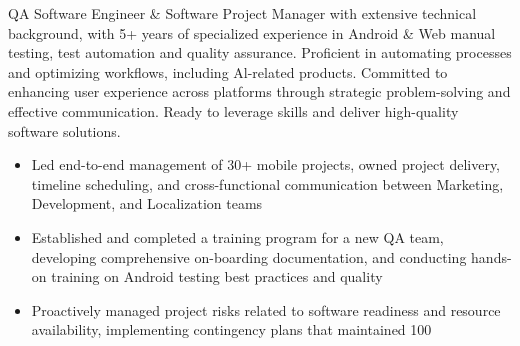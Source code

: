 \documentclass[10pt,a4paper,ragged2e]{altacv}
\begin{document}

\begin{fullwidth}
\makecvheader
\end{fullwidth}


QA Software Engineer \& Software Project Manager with extensive technical background, with 5+ years of specialized experience in Android \& Web manual testing, test automation and quality assurance. Proficient in automating processes and optimizing workflows, including Al-related products. Committed to enhancing user experience across platforms through strategic problem-solving and effective communication. Ready to leverage skills and deliver high-quality software solutions.



\begin{itemize}
\item Led end-to-end management of 30+ mobile projects, owned project delivery, timeline scheduling, and cross-functional communication between Marketing, Development, and Localization teams
\item Established and completed a training program for a new QA team, developing comprehensive on-boarding documentation, and conducting hands-on training on Android testing best practices and quality
\item Proactively managed project risks related to software readiness and resource availability, implementing contingency plans that maintained 100%
\end{itemize}
\end{document}
